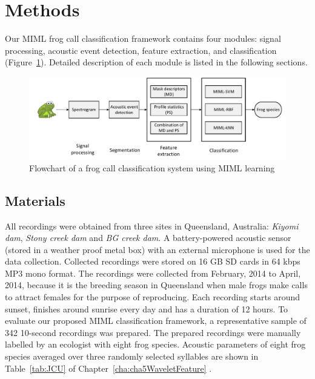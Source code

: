 \section{Methods}
Our MIML frog call classification framework contains four modules: signal processing, acoustic event detection, feature
extraction, and classification (Figure~\ref{fig:flowchart}). Detailed description of each module is listed in the following sections. 

\begin{figure}[htb!]
\centering
\includegraphics[width=\textwidth]{image/Ch6/flowchart.pdf}
\caption{Flowchart of a frog call classification system using MIML learning}
\label{fig:flowchart}
\end{figure}


\subsection{Materials}
\label{chap5:Materials}

All recordings were obtained from three sites in Queensland, Australia: \textit{Kiyomi dam}, \textit{Stony creek dam} and  \textit{BG creek dam}.
A battery-powered acoustic sensor (stored in a weather proof metal box) with an external microphone is used for the data collection. Collected recordings were stored on 16 GB SD cards in 64 kbps MP3 mono format. 
The recordings were collected from February, 2014 to April, 2014, because it is the breeding season in Queensland when male frogs make calls to attract females for the purpose of reproducing. Each recording starts around sunset, finishes around sunrise every day and has a duration of 12 hours. To evaluate our proposed MIML classification framework, a representative sample of 342 10-second recordings was prepared. The prepared recordings were manually labelled by an ecologist with eight frog species. Acoustic parameters of eight frog species averaged over three randomly selected syllables are shown in Table~\ref{tab:JCU} of Chapter~\ref{cha:cha5WaveletFeature} . 



